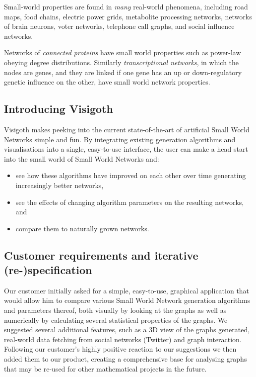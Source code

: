 \documentclass[a4paper,11pt,titlepage]{article}
\begin{document}
Small-world properties are found in \emph{many} real-world phenomena, including road maps, food chains, electric power grids, metabolite processing networks, networks of brain neurons, voter networks, telephone call graphs, and social influence networks.

Networks of \emph{connected proteins} have small world properties such as power-law obeying degree distributions. Similarly \emph{transcriptional networks}, in which the nodes are genes, and they are linked if one gene has an up or down-regulatory genetic influence on the other, have small world network properties.


\subsection{Introducing Visigoth}

Visigoth makes peeking into the current state-of-the-art of artificial Small
World Networks simple and fun. By integrating existing generation algorithms and
visualisations into a single, easy-to-use interface, the user can make a head
start into the small world of Small World Networks and:

\begin{itemize}
  \item see how these algorithms have improved on each other over time
    generating increasingly better networks,
  \item see the effects of changing algorithm parameters on the
    resulting networks, and
  \item compare them to naturally grown networks.
\end{itemize}

\subsection{Customer requirements and iterative (re-)specification}

%
%

Our customer initially asked for a simple, easy-to-use, graphical
application that would allow him to compare various Small World
Network generation algorithms and parameters thereof, both visually
by looking at the graphs as well as numerically by calculating
several statistical properties of the graphs.
We suggested several additional features, such as a 3D view of the
graphs generated, real-world data fetching from social networks
(Twitter) and graph interaction. Following our customer's highly
positive reaction to our suggestions we then added them to our
product, creating a comprehensive base for analysing graphs that
may be re-used for other mathematical projects in the future.
\end{document}
